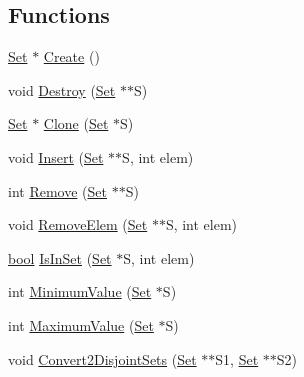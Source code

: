 \subsection*{Functions}
\begin{DoxyCompactItemize}
\item 
\hyperlink{namespacegft_1_1Set_a82cadd31ebabd3c72c7f099c4980f45b}{Set} $\ast$ \hyperlink{namespacegft_1_1Set_a0cd10ccbe8ba0246ada488058358c43a}{Create} ()
\item 
void \hyperlink{namespacegft_1_1Set_a81db707bbaa9a4c6e7d31281ee589de1}{Destroy} (\hyperlink{namespacegft_1_1Set_a82cadd31ebabd3c72c7f099c4980f45b}{Set} $\ast$$\ast$S)
\item 
\hyperlink{namespacegft_1_1Set_a82cadd31ebabd3c72c7f099c4980f45b}{Set} $\ast$ \hyperlink{namespacegft_1_1Set_a848a10202a31e8c32a1d04feb326c610}{Clone} (\hyperlink{namespacegft_1_1Set_a82cadd31ebabd3c72c7f099c4980f45b}{Set} $\ast$S)
\item 
void \hyperlink{namespacegft_1_1Set_af1db4dc0b9c65e0760a55328ea572984}{Insert} (\hyperlink{namespacegft_1_1Set_a82cadd31ebabd3c72c7f099c4980f45b}{Set} $\ast$$\ast$S, int elem)
\item 
int \hyperlink{namespacegft_1_1Set_af582f943dc56b7d7a60fd9e2d870b498}{Remove} (\hyperlink{namespacegft_1_1Set_a82cadd31ebabd3c72c7f099c4980f45b}{Set} $\ast$$\ast$S)
\item 
void \hyperlink{namespacegft_1_1Set_a97e4da5c6801f9f0f5276c9fad1098a1}{Remove\-Elem} (\hyperlink{namespacegft_1_1Set_a82cadd31ebabd3c72c7f099c4980f45b}{Set} $\ast$$\ast$S, int elem)
\item 
\hyperlink{namespacegft_a033dba4822661600b08d2bbf16879252}{bool} \hyperlink{namespacegft_1_1Set_aa09db7e71f35a11efcda907014e6df91}{Is\-In\-Set} (\hyperlink{namespacegft_1_1Set_a82cadd31ebabd3c72c7f099c4980f45b}{Set} $\ast$S, int elem)
\item 
int \hyperlink{namespacegft_1_1Set_a5075db818a432db08f36b452e8ee7e56}{Minimum\-Value} (\hyperlink{namespacegft_1_1Set_a82cadd31ebabd3c72c7f099c4980f45b}{Set} $\ast$S)
\item 
int \hyperlink{namespacegft_1_1Set_a84383e491d2875c7796835d89b947970}{Maximum\-Value} (\hyperlink{namespacegft_1_1Set_a82cadd31ebabd3c72c7f099c4980f45b}{Set} $\ast$S)
\item 
void \hyperlink{namespacegft_1_1Set_a16ba659e1accaa56ebd4cbdd82215d2d}{Convert2\-Disjoint\-Sets} (\hyperlink{namespacegft_1_1Set_a82cadd31ebabd3c72c7f099c4980f45b}{Set} $\ast$$\ast$S1, \hyperlink{namespacegft_1_1Set_a82cadd31ebabd3c72c7f099c4980f45b}{Set} $\ast$$\ast$S2)

\end{DoxyCompactItemize}
